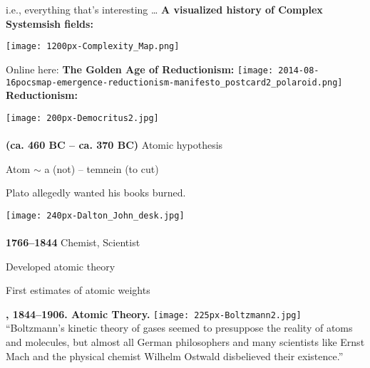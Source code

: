   
    i.e., everything that's interesting \ldots
  \textbf{A visualized history of Complex Systemsish fields:}

  \texttt{[image: 1200px-Complexity\_Map.png]}
  

  Online here:
  \textbf{The Golden Age of Reductionism:}
  \texttt{[image: 2014-08-16pocsmap-emergence-reductionism-manifesto\_postcard2\_polaroid.png]}
  \textbf{Reductionism:}
    
    \texttt{[image: 200px-Democritus2.jpg]}\\
    
    \textbf{
        \\
        (ca. 460 BC -- ca. 370 BC)
      }
        Atomic hypothesis
       
        Atom $\sim$ a (not) -- temnein (to cut)
       
        Plato allegedly wanted his books burned.
  

  \medskip
    
    \texttt{[image: 240px-Dalton\_John\_desk.jpg]}\\
    
    \textbf{
        \\
        1766--1844
      }
        Chemist, Scientist
       
        Developed atomic theory
       
        First estimates of atomic weights
  

  \textbf{ , 1844--1906. Atomic Theory.}
      \texttt{[image: 225px-Boltzmann2.jpg]}\\
      
      \small
      ``Boltzmann's kinetic theory of gases seemed to presuppose the
      reality of atoms and molecules, but almost all German philosophers and
      many scientists like Ernst Mach and the physical chemist Wilhelm
      Ostwald disbelieved their existence.''
  
